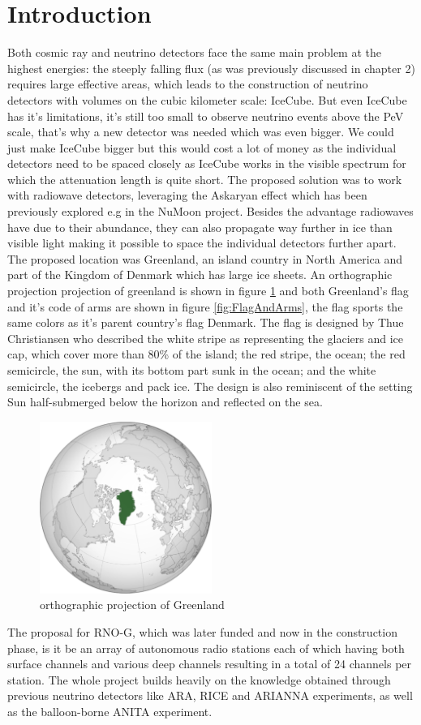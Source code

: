\documentclass[11pt,a4paper,faculty=we,language=en,doctype=report]{cls/ugent-doc}
\begin{document}
\section{Introduction}
Both cosmic ray and neutrino detectors face the same main problem at the
highest energies: the steeply falling flux (as was previously discussed in
chapter 2) requires large effective areas, which leads to the construction of
neutrino detectors with volumes on the cubic kilometer scale: IceCube.  But
even IceCube has it's limitations, it's still too small to observe neutrino
events above the PeV scale, that's why a new detector was needed which was even
bigger.  We could just make IceCube bigger but this would cost a lot of money
as the individual detectors need to be spaced closely as IceCube works in the
visible spectrum for which the attenuation length is quite short. The proposed
solution was to work with radiowave detectors, leveraging the Askaryan effect
which has been previously explored e.g in the NuMoon project.  Besides the
advantage radiowaves have due to their abundance, they can also propagate way
further in ice than visible light making it possible to space the individual
detectors further apart. The proposed location was Greenland, an island country
in North America and part of the Kingdom of Denmark which has large ice sheets.
An orthographic projection projection of greenland is shown in figure
\ref{fig:GreenlandOP} and both Greenland's flag and it's code of arms are shown
in figure \ref{fig:FlagAndArms}, the flag sports the same colors as it's parent
country's flag Denmark. The flag is designed by Thue Christiansen who described
the white stripe as representing the glaciers and ice cap, which cover more
than 80\% of the island; the red stripe, the ocean; the red semicircle, the
sun, with its bottom part sunk in the ocean; and the white semicircle, the
icebergs and pack ice. The design is also reminiscent of the setting Sun
half-submerged below the horizon and reflected on the sea.
\begin{figure}
  \centering
  \includegraphics[width=0.5\textwidth]{figures/GreenlandOP.pdf}
  \caption{orthographic projection of Greenland}
  \label{fig:GreenlandOP}
\end{figure}
\newpage
The proposal for RNO-G, which was later funded and now in the construction
phase, is it be an array of autonomous radio stations each of which having both
surface channels and various deep channels resulting in a total of 24 channels
per station. The whole project builds heavily on the knowledge obtained through
previous neutrino detectors like ARA, RICE and ARIANNA experiments, as well as
the balloon-borne ANITA experiment.
\end{document}

